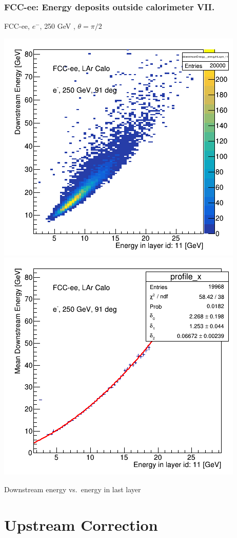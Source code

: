 \documentclass[aspectratio=169]{beamer}
\newcommand{\redtext}[1]{%
  \textcolor{myRed}{#1}
}
\begin{document}
\begin{frame}
  \frametitle{FCC-ee: Energy deposits outside calorimeter VII.}

  \centering
  FCC-ee, $e^{-}$, \redtext{250 GeV}, $\theta = \pi/2$ \\[1.5ex]
  \begin{adjustwidth}{-9mm}{-9mm}
    \includegraphics[width=0.49\linewidth]{figures/12layers/hist_downstream_vs_layer_11_91deg_250GeV.png}
    \includegraphics[width=0.49\linewidth]{figures/12layers/profile_downstream_vs_layer_11_91deg_250GeV.png}
  \end{adjustwidth}
  \redtext{Downstream} energy vs.\ energy in last layer
\end{frame}


\section{Upstream Correction}
\end{document}
